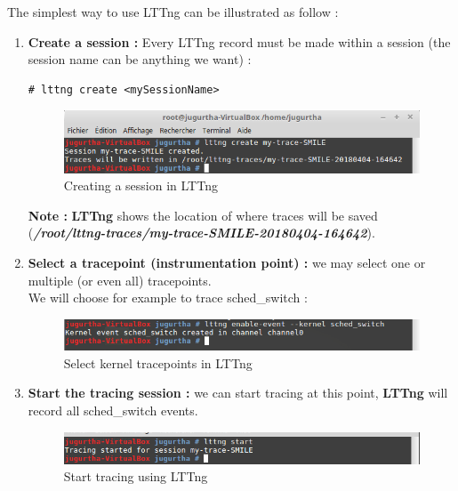 The simplest way to use LTTng can be illustrated as follow :
\begin{enumerate}
	\item \textbf{Create a session :} Every LTTng record must be made within a session (the session name can be anything we want) :
		\begin{lstlisting}[style=BashInputStyle]
# lttng create <mySessionName>
	\end{lstlisting}	

		\begin{figure}[H]
			\centering
        	\includegraphics[scale=0.42]{img/solution/create-session-lttng.png}
        	\caption{Creating a session in LTTng}
        	\label{Creating a session in LTTng}
    	\end{figure}	
\textbf{\color{orange}Note :} \textbf{LTTng} shows the location of where traces will be saved (\textit{\textbf{/root/lttng-traces/my-trace-SMILE-20180404-164642}}).	
	
	\item \textbf{Select a tracepoint (instrumentation point) : } we may select one or multiple (or even all) tracepoints.\\
We will choose for example to trace \og sched\_switch \fg :

		\begin{figure}[H]
			\centering
        	\includegraphics[scale=0.45]{img/solution/lttng-select-event.png}
        	\caption{Select kernel tracepoints in LTTng}
        	\label{Select kernel tracepoints in LTTng}
    	\end{figure}



	\item \textbf{Start the tracing session :} we can start tracing at this point, \textbf{LTTng} will record all \og sched\_switch \fg events.
		\begin{figure}[H]
			\centering
        	\includegraphics[scale=0.45]{img/solution/lttng-start-tracing.png}
        	\caption{Start tracing using LTTng}
        	\label{Start tracing using LTTng}
    	\end{figure}



\end{enumerate}
